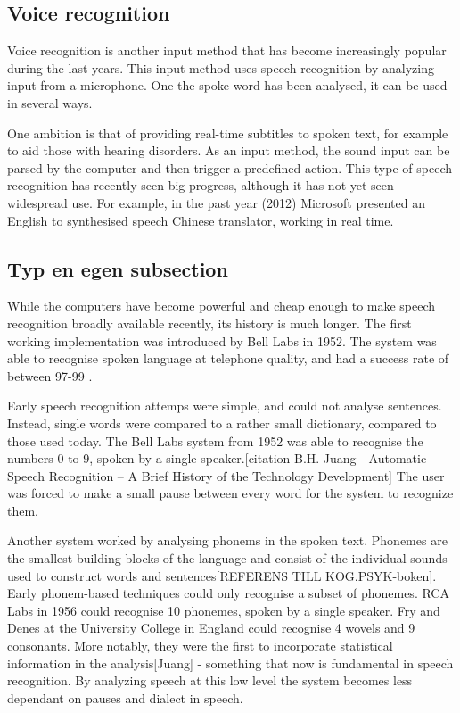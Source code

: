 
\subsection{Voice recognition}

Voice recognition is another input method that has become increasingly popular during the last years. This input method uses speech recognition by analyzing input from a microphone. One the spoke word has been analysed, it can be used in several ways.

One ambition is that of providing real-time subtitles to spoken text, for example to aid those with hearing disorders. As an input method, the sound input can be parsed by the computer and then trigger a predefined action. This type of speech recognition has recently seen big progress, although it has not yet seen widespread use. For example, in the past year (2012) Microsoft presented an English to synthesised speech Chinese translator, working in real time.

\subsection{Typ en egen subsection}

While the computers have become powerful and cheap enough to make speech recognition broadly available recently, its history is much longer. The first working implementation was introduced by Bell Labs in 1952. The system was able to recognise spoken language at telephone quality, and had a success rate of between 97-99 \cite{Davis52}.

Early speech recognition attemps were simple, and could not analyse sentences. Instead, single words were compared to a rather small dictionary, compared to those used today. The Bell Labs system from 1952 was able to recognise the numbers 0 to 9, spoken by a single speaker.[citation B.H. Juang - Automatic Speech Recognition – A Brief History of the Technology Development] The user was forced to make a small pause between every word for the system to recognize them. 

Another system worked by analysing phonems in the spoken text. Phonemes are the smallest building blocks of the language and consist of the individual sounds used to construct words and sentences[REFERENS TILL KOG.PSYK-boken]. Early phonem-based techniques could only recognise a subset of phonemes. RCA Labs in 1956 could recognise 10 phonemes, spoken by a single speaker. Fry and Denes at the University College in England could recognise 4 wovels and 9 consonants. More notably, they were the first to incorporate statistical information in the analysis[Juang] - something that now is fundamental in speech recognition. By analyzing speech at this low level the system becomes less dependant on pauses and dialect in speech.

